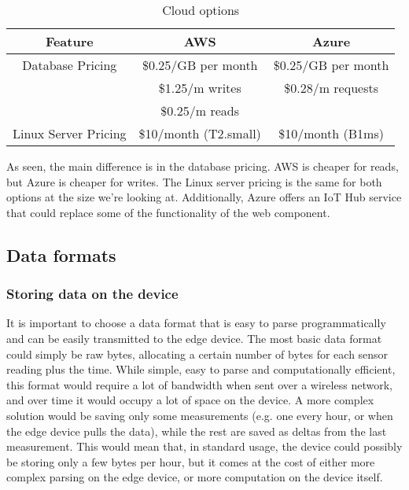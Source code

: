 \begin{table}[!h]
    \centering
    \begin{tabular}{c c c}
        \hline
        \textbf{Feature} & \textbf{AWS} & \textbf{Azure} \\
        \hline
        Database Pricing &
            \$0.25/GB per month & \$0.25/GB per month \\
         & \$1.25/m writes & \$0.28/m requests \\
         & \$0.25/m reads \\
         \hline
        Linux Server Pricing &
            \$10/month (T2.small) & 
            \$10/month (B1ms) \\
        \hline
        \end{tabular}
    \caption{Cloud options}
    \label{tab:cloud_options}
\end{table}

As seen, the main difference is in the database pricing. AWS is cheaper for reads,
but Azure is cheaper for writes. The Linux server pricing is the same for both options
at the size we're looking at. Additionally, Azure offers an IoT Hub service that
could replace some of the functionality of the web component.
\subsection{Data formats}
\subsubsection*{Storing data on the device}
It is important to choose a data format that is easy to parse programmatically and
can be easily transmitted to the edge device. The most basic data format could simply
be raw bytes, allocating a certain number of bytes for each sensor reading plus the
time. While simple, easy to parse and computationally efficient, this format would
require a lot of bandwidth when sent over a wireless network, and over time it would
occupy a lot of space on the device. A more complex solution would be saving only some
measurements (e.g. one every hour, or when the edge device pulls the data), while
the rest are saved as deltas from the last measurement. This would mean that, in
standard usage, the device could possibly be storing only a few bytes per hour, but
it comes at the cost of either more complex parsing on the edge device, or more
computation on the device itself. \\

